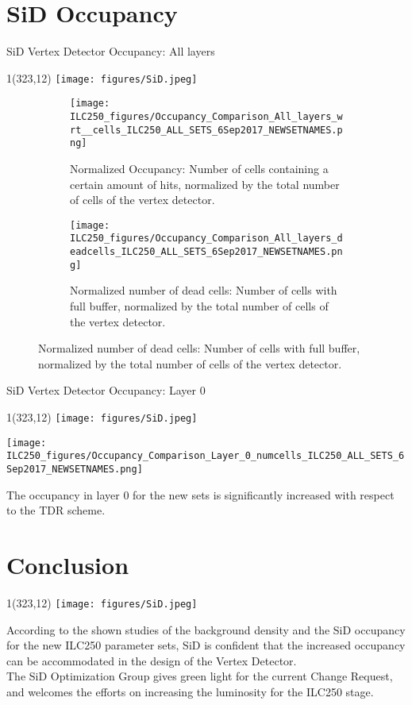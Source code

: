 \documentclass[xcolor={dvipsnames}]{beamer}
\newcommand{\sidlogo}{
  \setlength{\TPHorizModule}{1pt}
  \setlength{\TPVertModule}{1pt}
  \begin{textblock}{1}(323,12)
   \texttt{[image: figures/SiD.jpeg]}
  \end{textblock}
  }
\begin{document}
\section{SiD Occupancy}
\begin{frame}{SiD Vertex Detector Occupancy: All layers}
\sidlogo
 \begin{figure}
\centering
\begin{subfigure}[t]{0.48\textwidth}
\centering
\texttt{[image: ILC250\_figures/Occupancy\_Comparison\_All\_layers\_wrt\_\_cells\_ILC250\_ALL\_SETS\_6Sep2017\_NEWSETNAMES.png]}
\caption{\alert{Normalized Occupancy}: Number of cells containing a certain amount of hits, normalized by the total number of cells of the vertex detector.}
\end{subfigure}
\hspace*{0.2cm}
\begin{subfigure}[t]{0.48\textwidth}
\centering
\texttt{[image: ILC250\_figures/Occupancy\_Comparison\_All\_layers\_deadcells\_ILC250\_ALL\_SETS\_6Sep2017\_NEWSETNAMES.png]}
\caption{\alert{Normalized number of dead cells}: Number of cells with full buffer, normalized by the total number of cells of the vertex detector.}
\end{subfigure}
\end{figure}
\end{frame}

\begin{frame}{SiD Vertex Detector Occupancy: Layer 0}
\sidlogo
\begin{center}
 \texttt{[image: ILC250\_figures/Occupancy\_Comparison\_Layer\_0\_numcells\_ILC250\_ALL\_SETS\_6Sep2017\_NEWSETNAMES.png]}
\end{center}
The occupancy in layer 0 for the new sets is significantly increased with respect to the TDR scheme.
\end{frame}

\section{Conclusion}
\begin{frame}
\sidlogo
 According to the shown studies of the background density and the SiD occupancy for the new ILC250 parameter sets, SiD is confident that the increased occupancy can be accommodated in the design of the Vertex Detector.\\
 The SiD Optimization Group gives green light for the current Change Request, and welcomes the efforts on increasing the luminosity for the ILC250 stage.
\end{frame}
\end{document}
